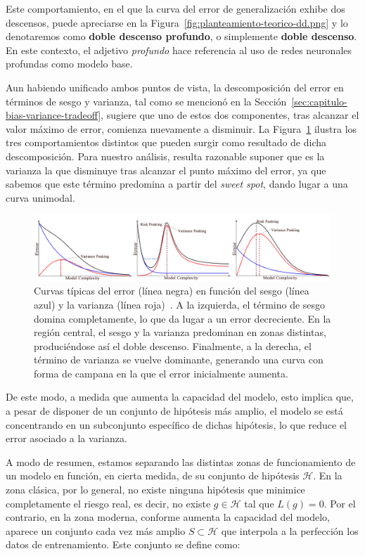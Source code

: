 Este comportamiento, en el que la curva del error de generalización exhibe dos descensos, puede apreciarse en la Figura~\ref{fig:planteamiento-teorico-dd.png} y lo denotaremos como \textbf{doble descenso profundo}, o simplemente \textbf{doble descenso}. En este contexto, el adjetivo \textit{profundo} hace referencia al uso de redes neuronales profundas como modelo base.

Aun habiendo unificado ambos puntos de vista, la descomposición del error en términos de sesgo y varianza, tal como se mencionó en la Sección~\ref{sec:capitulo-bias-variance-tradeoff}, sugiere que uno de estos dos componentes, tras alcanzar el valor máximo de error, comienza nuevamente a disminuir. La Figura~\ref{fig:bias-variance-peak} ilustra los tres comportamientos distintos que pueden surgir como resultado de dicha descomposición. Para nuestro análisis, resulta razonable suponer que es la varianza la que disminuye tras alcanzar el punto máximo del error, ya que sabemos que este término predomina a partir del \textit{sweet spot}, dando lugar a una curva unimodal.

\begin{figure}[h]
    \centering
    \includegraphics[width=0.9\linewidth]{img/bias-variance-peak.png}
    \caption[Curvas típicas del error en función del sesgo y la varianza~\cite{Yang2020}.]{Curvas típicas del error (línea negra) en función del sesgo (línea azul) y la varianza (línea roja)~\cite{Yang2020}. A la izquierda, el término de sesgo domina completamente, lo que da lugar a un error decreciente. En la región central, el sesgo y la varianza predominan en zonas distintas, produciéndose así el doble descenso. Finalmente, a la derecha, el término de varianza se vuelve dominante, generando una curva con forma de campana en la que el error inicialmente aumenta.}\label{fig:bias-variance-peak}
\end{figure}

De este modo, a medida que aumenta la capacidad del modelo, esto implica que, a pesar de disponer de un conjunto de hipótesis más amplio, el modelo se está concentrando en un subconjunto específico de dichas hipótesis, lo que reduce el error asociado a la varianza.

A modo de resumen, estamos separando las distintas zonas de funcionamiento de un modelo en función, en cierta medida, de su conjunto de hipótesis $\mathcal{H}$. En la zona clásica, por lo general, no existe ninguna hipótesis que minimice completamente el riesgo real, es decir, no existe $g \in \mathcal{H}$ tal que $L(g) = 0$. Por el contrario, en la zona moderna, conforme aumenta la capacidad del modelo, aparece un conjunto cada vez más amplio $S \subset \mathcal{H}$ que interpola a la perfección los datos de entrenamiento. Este conjunto se define como:  

